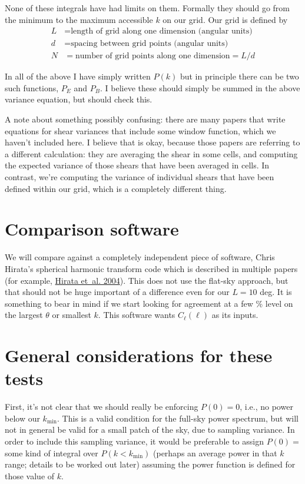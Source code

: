 \documentclass[preprint]{aastex}
\newcommand{\kmin}{\ensuremath{k_\mathrm{min}}}
\begin{document}
None of these integrals have had limits on them.  Formally they should
go from the minimum to the maximum accessible $k$ on our grid.  Our
grid is defined by
\begin{align}
L &= \mbox{length of grid along one dimension (angular units)}\\
d &= \mbox{spacing between grid points (angular units)}\\
N &= \mbox{number of grid points along one dimension} = L/d
\end{align}

In all of the above I have simply written $P(k)$ but in principle there can be
two such functions, $P_{E}$ and $P_B$.  I believe these
should simply be summed in the above variance equation, but should check this.

A note about something possibly confusing: there are many papers that
write equations for shear variances that include some window function,
which we haven't included here.  I believe that is okay, because those
papers are referring to a different calculation: they are averaging
the shear in some cells, and computing the expected variance of those
shears that have been averaged in cells.  In contrast, we're computing
the variance of individual shears that have been defined within our
grid, which is a completely different thing.

\section{Comparison software}

We will compare against a completely independent piece of software,
Chris Hirata's spherical harmonic transform code which is described in
multiple papers (for example,
\href{http://adsabs.harvard.edu/abs/2004PhRvD..70j3501H}{Hirata
  et~al. 2004}).  This does not use the flat-sky
approach, but that should not be huge important of a difference even
for our $L=10$ deg.  It is something to bear in mind if we start
looking for agreement at a few \% level on the largest $\theta$ or
smallest $k$.  This software wants $C_\ell(\ell)$ as its inputs.

\section{General considerations for these tests}

First, it's not clear that we should really be enforcing $P(0)=0$,
i.e., no power below our \kmin.
This is a valid condition for the full-sky power spectrum, but will
not in general be valid for a small patch of the sky, due to sampling
variance.  In order to include this sampling variance, it would be
preferable to assign $P(0)=$ some kind of integral over $P(k<\kmin)$
(perhaps an average power in that $k$ range; details to be worked out later) assuming the power function is
defined for those value of $k$.
\end{document}
